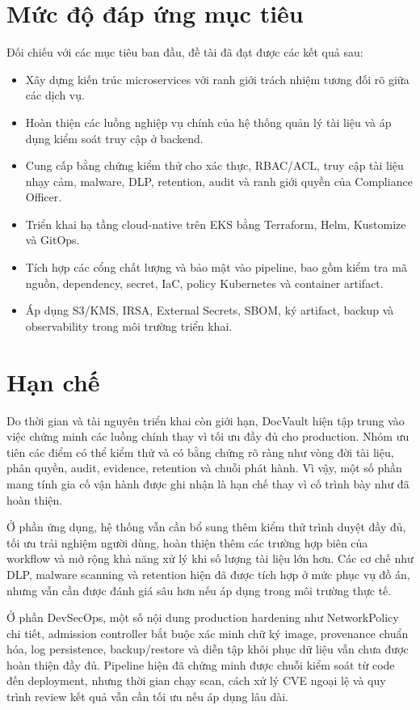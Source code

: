 \section{Mức độ đáp ứng mục tiêu}

Đối chiếu với các mục tiêu ban đầu, đề tài đã đạt được các kết quả sau:

\begin{itemize}
  \item Xây dựng kiến trúc microservices với ranh giới trách nhiệm tương đối rõ giữa các dịch vụ.
  \item Hoàn thiện các luồng nghiệp vụ chính của hệ thống quản lý tài liệu và áp dụng kiểm soát truy cập ở backend.
  \item Cung cấp bằng chứng kiểm thử cho xác thực, RBAC/ACL, truy cập tài liệu nhạy cảm, malware, DLP, retention, audit và ranh giới quyền của Compliance Officer.
  \item Triển khai hạ tầng cloud-native trên EKS bằng Terraform, Helm, Kustomize và GitOps.
  \item Tích hợp các cổng chất lượng và bảo mật vào pipeline, bao gồm kiểm tra mã nguồn, dependency, secret, IaC, policy Kubernetes và container artifact.
  \item Áp dụng S3/KMS, IRSA, External Secrets, SBOM, ký artifact, backup và observability trong môi trường triển khai.
\end{itemize}

\section{Hạn chế}

Do thời gian và tài nguyên triển khai còn giới hạn, DocVault hiện tập trung vào việc chứng minh các luồng chính thay vì tối ưu đầy đủ cho production. Nhóm ưu tiên các điểm có thể kiểm thử và có bằng chứng rõ ràng như vòng đời tài liệu, phân quyền, audit, evidence, retention và chuỗi phát hành. Vì vậy, một số phần mang tính gia cố vận hành được ghi nhận là hạn chế thay vì cố trình bày như đã hoàn thiện.

Ở phần ứng dụng, hệ thống vẫn cần bổ sung thêm kiểm thử trình duyệt đầy đủ, tối ưu trải nghiệm người dùng, hoàn thiện thêm các trường hợp biên của workflow và mở rộng khả năng xử lý khi số lượng tài liệu lớn hơn. Các cơ chế như DLP, malware scanning và retention hiện đã được tích hợp ở mức phục vụ đồ án, nhưng vẫn cần được đánh giá sâu hơn nếu áp dụng trong môi trường thực tế.

Ở phần DevSecOps, một số nội dung production hardening như NetworkPolicy chi tiết, admission controller bắt buộc xác minh chữ ký image, provenance chuẩn hóa, log persistence, backup/restore và diễn tập khôi phục dữ liệu vẫn chưa được hoàn thiện đầy đủ. Pipeline hiện đã chứng minh được chuỗi kiểm soát từ code đến deployment, nhưng thời gian chạy scan, cách xử lý CVE ngoại lệ và quy trình review kết quả vẫn cần tối ưu nếu áp dụng lâu dài.

